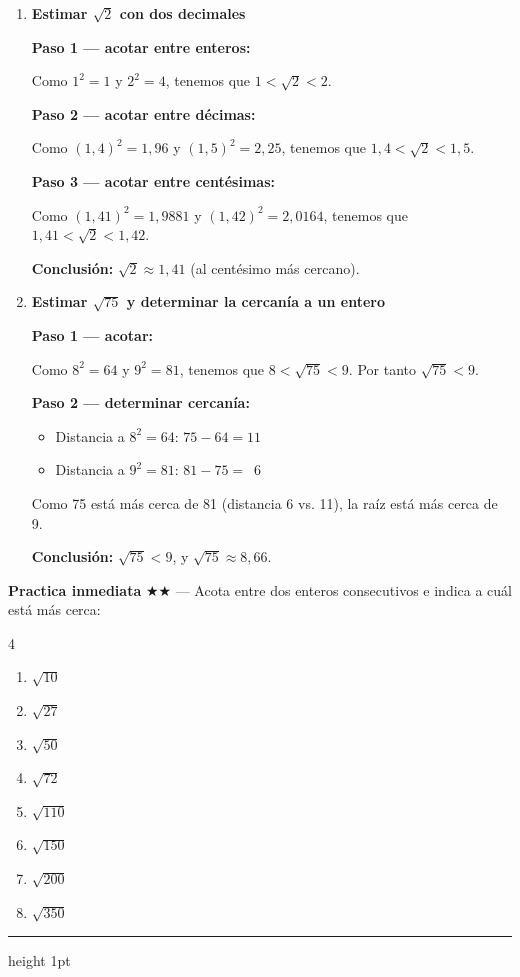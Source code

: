 \documentclass[11pt, letterpaper]{article}
\newcommand{\subbloque}[1]{%
  \vspace{14pt}
  \noindent{\large\bfseries\color{zenitnavy} #1}\par
  \vspace{4pt}\hrule height 1pt\vspace{8pt}}
\begin{document}
\begin{tcolorbox}[examplebox, title={Ejemplos — estimación por aproximación sucesiva}]
\begin{enumerate}[label=\textbf{Ej. \arabic*.}, leftmargin=*, itemsep=16pt]

\item \textbf{Estimar $\sqrt{2}$ con dos decimales}

\textbf{Paso 1 — acotar entre enteros:}

Como $1^2=1$ y $2^2=4$, tenemos que $1 < \sqrt{2} < 2$.

\textbf{Paso 2 — acotar entre décimas:}

Como $(1{,}4)^2=1{,}96$ y $(1{,}5)^2=2{,}25$, tenemos que $1{,}4 < \sqrt{2} < 1{,}5$.

\textbf{Paso 3 — acotar entre centésimas:}

Como $(1{,}41)^2=1{,}9881$ y $(1{,}42)^2=2{,}0164$, tenemos que $1{,}41 < \sqrt{2} < 1{,}42$.

\textbf{Conclusión:} $\sqrt{2} \approx 1{,}41$ (al centésimo más cercano).

\item \textbf{Estimar $\sqrt{75}$ y determinar la cercanía a un entero}

\textbf{Paso 1 — acotar:}

Como $8^2=64$ y $9^2=81$, tenemos que $8 < \sqrt{75} < 9$. Por tanto $\sqrt{75} < 9$.

\textbf{Paso 2 — determinar cercanía:}
\begin{itemize}[itemsep=2pt]
  \item Distancia a $8^2=64$: $75-64=11$
  \item Distancia a $9^2=81$: $81-75=\phantom{1}6$
\end{itemize}

Como 75 está más cerca de 81 (distancia 6 vs. 11), la raíz está más cerca de 9.

\textbf{Conclusión:} $\sqrt{75} < 9$, y $\sqrt{75} \approx 8{,}66$.

\end{enumerate}
\end{tcolorbox}

\medskip
\textbf{Practica inmediata} \quad $\bigstar\bigstar$ — Acota entre dos enteros consecutivos e indica a cuál está más cerca:
\begin{multicols}{4}
\begin{enumerate}[label=\alph*), leftmargin=*]
  \item $\sqrt{10}$
  \item $\sqrt{27}$
  \item $\sqrt{50}$
  \item $\sqrt{72}$
  \item $\sqrt{110}$
  \item $\sqrt{150}$
  \item $\sqrt{200}$
  \item $\sqrt{350}$
\end{enumerate}
\end{multicols}
\clearpage
\subbloque{Ejercicios propuestos}
\end{document}
